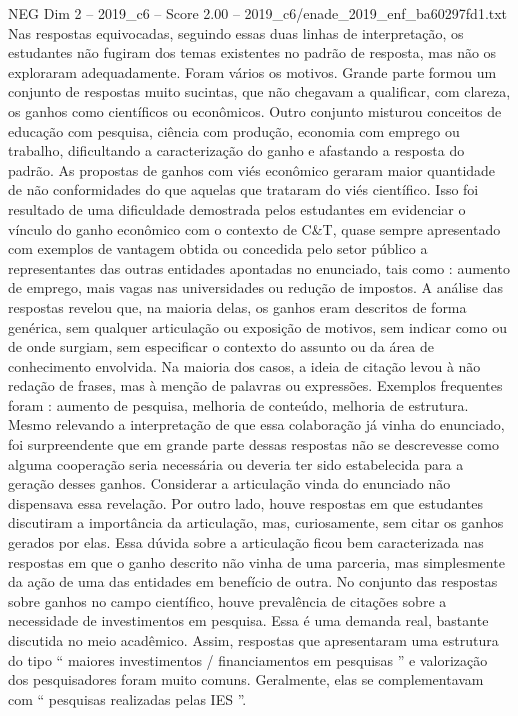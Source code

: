 \begin{textsample}{NEG Dim 2 – 2019\_c6 – Score 2.00 – 2019\_c6/enade\_2019\_enf\_ba60297fd1.txt}
Nas respostas equivocadas, seguindo essas duas linhas de interpretação, os estudantes não fugiram dos temas existentes no padrão de resposta, mas não os exploraram adequadamente.
Foram vários os motivos.
Grande parte formou um conjunto de respostas muito sucintas, que não chegavam a qualificar, com clareza, os ganhos como científicos ou econômicos.
Outro conjunto misturou conceitos de educação com pesquisa, ciência com produção, economia com emprego ou trabalho, dificultando a caracterização do ganho e afastando a resposta do padrão.
As propostas de ganhos com viés econômico geraram maior quantidade de não conformidades do que aquelas que trataram do viés científico.
Isso foi resultado de uma dificuldade demostrada pelos estudantes em evidenciar o vínculo do ganho econômico com o contexto de C\&T, quase sempre apresentado com exemplos de vantagem obtida ou concedida pelo setor público a representantes das outras entidades apontadas no enunciado, tais como : aumento de emprego, mais vagas nas universidades ou redução de impostos.
A análise das respostas revelou que, na maioria delas, os ganhos eram descritos de forma genérica, sem qualquer articulação ou exposição de motivos, sem indicar como ou de onde surgiam, sem especificar o contexto do assunto ou da área de conhecimento envolvida.
Na maioria dos casos, a ideia de citação levou à não redação de frases, mas à menção de palavras ou expressões.
Exemplos frequentes foram : aumento de pesquisa, melhoria de conteúdo, melhoria de estrutura.
Mesmo relevando a interpretação de que essa colaboração já vinha do enunciado, foi surpreendente que em grande parte dessas respostas não se descrevesse como alguma cooperação seria necessária ou deveria ter sido estabelecida para a geração desses ganhos.
Considerar a articulação vinda do enunciado não dispensava essa revelação.
Por outro lado, houve respostas em que estudantes discutiram a importância da articulação, mas, curiosamente, sem citar os ganhos gerados por elas.
Essa dúvida sobre a articulação ficou bem caracterizada nas respostas em que o ganho descrito não vinha de uma parceria, mas simplesmente da ação de uma das entidades em benefício de outra.
No conjunto das respostas sobre ganhos no campo científico, houve prevalência de citações sobre a necessidade de investimentos em pesquisa.
Essa é uma demanda real, bastante discutida no meio acadêmico.
Assim, respostas que apresentaram uma estrutura do tipo “ maiores investimentos / financiamentos em pesquisas ” e valorização dos pesquisadores foram muito comuns.
Geralmente, elas se complementavam com “ pesquisas realizadas pelas IES ”.

\end{textsample}
